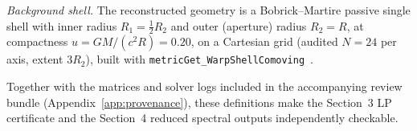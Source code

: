 \documentclass[11pt,a4paper]{article}
\begin{document}
\emph{Background shell.} The reconstructed geometry is a Bobrick--Martire passive single shell with inner radius $R_{1}=\tfrac12 R_{2}$ and outer (aperture) radius $R_{2}=R$, at compactness $u=GM/(c^{2}R)=0.20$, on a Cartesian grid (audited $N=24$ per axis, extent $3R_{2}$), built with \texttt{metricGet\_WarpShellComoving}~\cite{WarpFactoryCQG2024}.

Together with the matrices and solver logs included in the accompanying review bundle (Appendix~\ref{app:provenance}), these definitions make the Section~3 LP certificate and the Section~4 reduced spectral outputs independently checkable.



\end{document}
